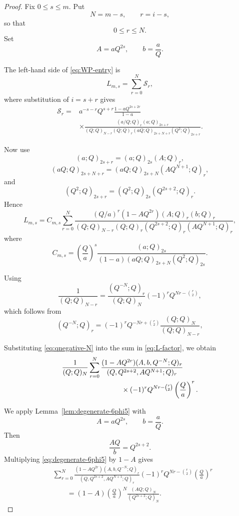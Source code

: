 \documentclass[11pt]{amsart}
\begin{document}
\begin{proof}
Fix \(0\leq s\leq m\).
Put
\[
N=m-s,
\qquad
r=i-s,
\]
so that
\[
0\leq r\leq N.
\]
Set
\[
A=aQ^{2s},
\qquad
b=\frac aQ.
\]

The left-hand side of \eqref{eq:WP-entry} is
\[
L_{m,s}
=
\sum_{r=0}^{N}\mathcal S_r,
\]
where substitution of \(i=s+r\) gives
\begin{align*}
\mathcal S_r
={}&
a^{-s-r}Q^{s+r}
\frac{1-aQ^{2s+2r}}{1-a}
\\
&\times
\frac{
(a/Q;Q)_r
(a;Q)_{2s+r}
}{
(Q;Q)_{N-r}
(Q;Q)_r
(aQ;Q)_{2s+N+r}
(Q^2;Q)_{2s+r}
}.
\end{align*}

Now use
\[
(a;Q)_{2s+r}
=
(a;Q)_{2s}(A;Q)_r,
\]
\[
(aQ;Q)_{2s+N+r}
=
(aQ;Q)_{2s+N}
(AQ^{N+1};Q)_r,
\]
and
\[
(Q^2;Q)_{2s+r}
=
(Q^2;Q)_{2s}
(Q^{2s+2};Q)_r.
\]
Hence
\begin{equation}\label{eq:L-factor}
L_{m,s}
=
C_{m,s}
\sum_{r=0}^{N}
\frac{
(Q/a)^r
(1-AQ^{2r})
(A;Q)_r(b;Q)_r
}{
(Q;Q)_{N-r}
(Q;Q)_r
(Q^{2s+2};Q)_r
(AQ^{N+1};Q)_r
},
\end{equation}
where
\begin{equation}\label{eq:C-ms}
C_{m,s}
=
\left(\frac Qa\right)^s
\frac{
(a;Q)_{2s}
}{
(1-a)
(aQ;Q)_{2s+N}
(Q^2;Q)_{2s}
}.
\end{equation}

Using
\begin{equation}\label{eq:qnegative-N}
\frac{1}{(Q;Q)_{N-r}}
=
\frac{(Q^{-N};Q)_r}{(Q;Q)_N}
(-1)^rQ^{Nr-\binom r2},
\end{equation}
which follows from
\[
(Q^{-N};Q)_r
=
(-1)^rQ^{-Nr+\binom r2}
\frac{(Q;Q)_N}{(Q;Q)_{N-r}},
\]



Substituting \eqref{eq:qnegative-N} into the sum in
\eqref{eq:L-factor}, we obtain
\begin{align}
&\frac1{(Q;Q)_N}
\sum_{r=0}^{N}
\frac{
(1-AQ^{2r})
(A,b,Q^{-N};Q)_r
}{
(Q,Q^{2s+2},AQ^{N+1};Q)_r
}
\nonumber\\
&\hspace{30mm}\times
(-1)^r
Q^{Nr-\binom r2}
\left(\frac Qa\right)^r.
\label{eq:pre-6phi5}
\end{align}

We apply Lemma~\ref{lem:degenerate-6phi5} with
\[
A=aQ^{2s},
\qquad
b=\frac aQ.
\]
Then
\[
\frac{AQ}{b}=Q^{2s+2}.
\]
Multiplying \eqref{eq:degenerate-6phi5} by \(1-A\) gives
\begin{align}
&\sum_{r=0}^{N}
\frac{
(1-AQ^{2r})(A,b,Q^{-N};Q)_r
}{
(Q,Q^{2s+2},AQ^{N+1};Q)_r
}
(-1)^rQ^{Nr-\binom r2}
\left(\frac Qa\right)^r
\nonumber\\
&\qquad
=
(1-A)
\left(\frac Qa\right)^N
\frac{(AQ;Q)_N}{(Q^{2s+2};Q)_N}.
\label{eq:6phi5-result}
\end{align}


\end{proof}
\end{document}
